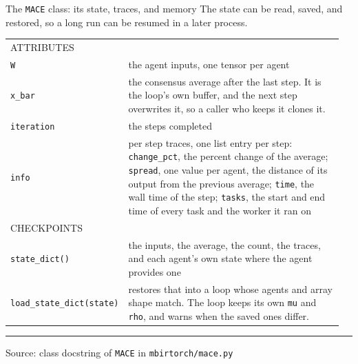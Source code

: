 \documentclass[aspectratio=169,10pt]{beamer}
\newcommand{\tagchip}[2]{{\setlength{\fboxsep}{2.5pt}\setlength{\fboxrule}{0.6pt}%
  \fcolorbox{white}{#1}{\textcolor{white}{\footnotesize\bfseries\strut #2}}}}
\newcommand{\macechip}{\tagchip{planAccent}{MACE}}
\newcommand{\speclabel}[1]{\textcolor{inkGray}{\scriptsize\MakeUppercase{#1}}}
\newcommand{\footnoteline}[1]{%
  \savebox{\notebox}{\begin{minipage}[b]{0.94\linewidth}\raggedright
    {\footnotesize\textcolor{inkGray}{#1}}\end{minipage}}%
  {\color{planAccent}\rule[-\dp\notebox]{2pt}{\dimexpr\ht\notebox+\dp\notebox\relax}}%
  \hspace{6pt}\usebox{\notebox}}
\newcommand{\source}[1]{\par\vfill{\scriptsize\textcolor{inkGray}{Source: #1}\par}}
\begin{document}
\begin{frame}{The \texttt{MACE} class: its state, traces, and memory \hfill \macechip}
  \vspace{0pt}
  {\small The state can be read, saved, and restored, so a long run can be
  resumed in a later process.}\par\vspace{4pt}
  {\scriptsize
  \begin{tabular}{@{}>{\raggedright\arraybackslash}p{0.30\linewidth}@{\hspace{6pt}}>{\raggedright\arraybackslash}p{0.66\linewidth}@{}}
    \speclabel{attributes} & \\[2pt]
    \texttt{W} & the agent inputs, one tensor per agent \\[2pt]
    \texttt{x\_bar} & the consensus average after the last step.  It is the loop's own buffer, and the next step overwrites it, so a caller who keeps it clones it. \\[2pt]
    \texttt{iteration} & the steps completed \\[2pt]
    \texttt{info} & per step traces, one list entry per step: \texttt{change\_pct}, the percent change of the average; \texttt{spread}, one value per agent, the distance of its output from the previous average; \texttt{time}, the wall time of the step; \texttt{tasks}, the start and end time of every task and the worker it ran on \\[6pt]
    \speclabel{checkpoints} & \\[2pt]
    \texttt{state\_dict()} & the inputs, the average, the count, the traces, and each agent's own state where the agent provides one \\[2pt]
    \texttt{load\_state\_dict(state)} & restores that into a loop whose agents and array shape match.  The loop keeps its own \texttt{mu} and \texttt{rho}, and warns when the saved ones differ. \\
  \end{tabular}}
  \vfill
  \footnoteline{Memory: each agent's output is added into the average as it
  arrives, so the loop holds three full size arrays beyond the agent
  inputs, whatever the number of agents.}
  \source{class docstring of \texttt{MACE} in \texttt{mbirtorch/mace.py}}
\end{frame}
\end{document}
